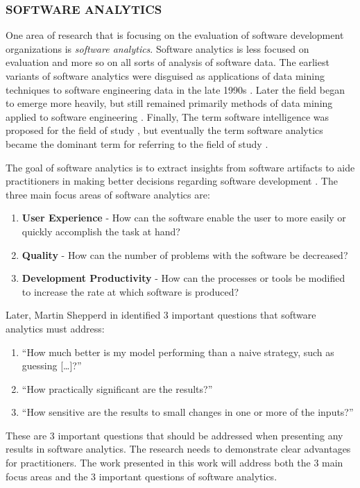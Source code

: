 \documentclass[SDSUThesis.tex]{subfiles}
\begin{document}
\subsubsection{SOFTWARE ANALYTICS}
\label{subsub:softwareanalytics}

    One area of research that is focusing on the evaluation 
    of software development organizations
    is \textit{software analytics}. 
    Software analytics is less focused on evaluation
    and more so on all sorts of analysis of software data.
    The earliest variants
    of software analytics were disguised as
    applications of data mining techniques to software 
    engineering data in the 
    late 1990s \cite{Ruhe1997,Ebert1999,Goel1997}.   
    Later the field began to emerge more heavily, but still
    remained primarily methods of data mining applied to 
    software engineering \cite{Kaner2004,Xie2009,Taylor2010,Halkidi2011}. 
    Finally, The term software intelligence was proposed for the field of study
    \cite{Hassan2010}, but eventually
    the term software analytics became the dominant term for referring to the 
    field of study \cite{Buse2010, Zhang2011}.
    
    The goal of software analytics is to extract insights
    from software artifacts to aide practitioners in making 
    better decisions regarding software
    development \cite{Zhang2013}.  The three main focus areas of 
    software analytics are:
    \begin{enumerate}
        \item \textbf{User Experience} - How can the software enable the 
            user to more easily or quickly 
            accomplish the task at hand?
        \item \textbf{Quality} - How can the number of problems with 
            the software be decreased?
        \item \textbf{Development Productivity} - How can the processes
            or tools be modified to increase 
            the rate at which software is produced? 
    \end{enumerate}

    Later, Martin Shepperd in \cite{Hassan2013} identified 3 important questions that software
    analytics must address:
    \begin{enumerate}
        \item ``How much better is my model performing than 
            a naive strategy, such as guessing [\ldots]?''
        \item ``How practically significant are the results?''
        \item ``How sensitive are the results to small changes in 
            one or more of the inputs?''
    \end{enumerate}
    These are 3 important questions that should be addressed 
    when presenting any results in software analytics.  The research
    needs to demonstrate clear advantages for practitioners.  The work
    presented in this work will address both the 3 main focus areas and
    the 3 important questions of software analytics.
\end{document}
